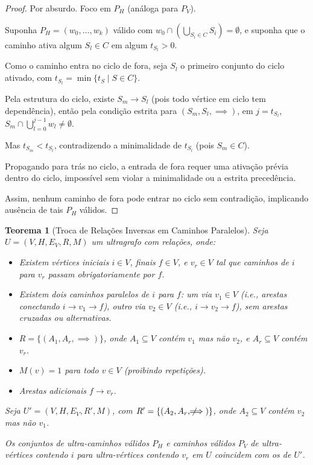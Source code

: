 \documentclass{article}
\newtheorem{theorem}{Teorema}
\begin{document}
\begin{proof}
Por absurdo. Foco em \( P_H \) (análoga para \( P_V \)).

Suponha \( P_H = (w_0, \dots, w_k) \) válido com \( w_0 \cap \left( \bigcup_{S_i \in C} S_i \right) = \emptyset \), e suponha que o caminho ativa algum \( S_l \in C \) em algum \( t_{S_l} > 0 \).

Como o caminho entra no ciclo de fora, seja \( S_l \) o primeiro conjunto do ciclo ativado, com \( t_{S_l} = \min \{ t_S \mid S \in C \} \).

Pela estrutura do ciclo, existe \( S_m \to S_l \) (pois todo vértice em ciclo tem dependência), então pela condição estrita para \( (S_m, S_l, \implies) \), em \( j = t_{S_l} \), \( S_m \cap \bigcup_{l=0}^{j-1} w_l \neq \emptyset \).

Mas \( t_{S_m} < t_{S_l} \), contradizendo a minimalidade de \( t_{S_l} \) (pois \( S_m \in C \)).

Propagando para trás no ciclo, a entrada de fora requer uma ativação prévia dentro do ciclo, impossível sem violar a minimalidade ou a estrita precedência.

Assim, nenhum caminho de fora pode entrar no ciclo sem contradição, implicando ausência de tais \( P_H \) válidos.
\end{proof}

\begin{theorem}[Troca de Relações Inversas em Caminhos Paralelos]
\hfill
Seja \( U = (V, H, E_V, R, M) \) um ultragrafo com relações, onde:

\begin{itemize}
    \item Existem vértices iniciais \( i \in V \), finais \( f \in V \), e \( v_r \in V \) tal que caminhos de \( i \) para \( v_r \) passam obrigatoriamente por \( f \).
    \item Existem dois caminhos paralelos de \( i \) para \( f \): um via \( v_1 \in V \) (i.e., arestas conectando \( i \to v_1 \to f \)), outro via \( v_2 \in V \) (i.e., \( i \to v_2 \to f \)), sem arestas cruzadas ou alternativas.
    \item \( R = \{ (A_1, A_r, \implies) \} \), onde \( A_1 \subseteq V \) contém \( v_1 \) mas não \( v_2 \), e \( A_r \subseteq V \) contém \( v_r \).
    \item \( M(v) = 1 \) para todo \( v \in V \) (proibindo repetições).
    \item Arestas adicionais \( f \to v_r \).
\end{itemize}

Seja \( U' = (V, H, E_V, R', M) \), com \( R' = \{ (A_2, A_r, \not\!\!\!\implies) \} \), onde \( A_2 \subseteq V \) contém \( v_2 \) mas não \( v_1 \).

Os conjuntos de ultra-caminhos válidos \( P_H \) e caminhos válidos \( P_V \) de ultra-vértices contendo \( i \) para ultra-vértices contendo \( v_r \) em \( U \) coincidem com os de \( U' \).
\end{theorem}
\end{document}
